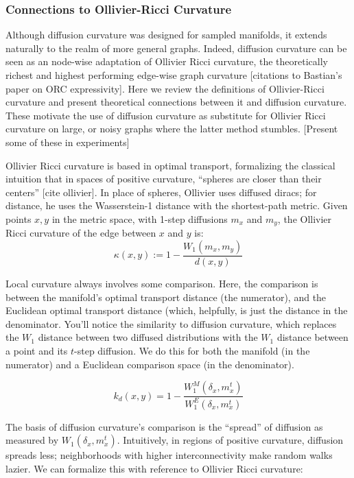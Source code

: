 \documentclass[
  letterpaper,
  DIV=11,
  numbers=noendperiod]{scrartcl}
\begin{document}
\subsubsection{Connections to Ollivier-Ricci
Curvature}\label{connections-to-ollivier-ricci-curvature}

Although diffusion curvature was designed for sampled manifolds, it
extends naturally to the realm of more general graphs. Indeed, diffusion
curvature can be seen as an node-wise adaptation of Ollivier Ricci
curvature, the theoretically richest and highest performing edge-wise
graph curvature {[}citations to Bastian's paper on ORC expressivity{]}.
Here we review the definitions of Ollivier-Ricci curvature and present
theoretical connections between it and diffusion curvature. These
motivate the use of diffusion curvature as substitute for Ollivier Ricci
curvature on large, or noisy graphs where the latter method stumbles.
{[}Present some of these in experiments{]}

Ollivier Ricci curvature is based in optimal transport, formalizing the
classical intuition that in spaces of positive curvature, ``spheres are
closer than their centers'' {[}cite ollivier{]}. In place of spheres,
Ollivier uses diffused diracs; for distance, he uses the Wasserstein-1
distance with the shortest-path metric. Given points \(x,y\) in the
metric space, with 1-step diffusions \(m_{x}\) and \(m_{y}\), the
Ollivier Ricci curvature of the edge between \(x\) and \(y\) is:
\[\kappa(x, y):=1-\frac{W_1\left(m_x, m_y\right)}{d(x, y)}\]

Local curvature always involves some comparison. Here, the comparison is
between the manifold's optimal transport distance (the numerator), and
the Euclidean optimal transport distance (which, helpfully, is just the
distance in the denominator. You'll notice the similarity to diffusion
curvature, which replaces the \(W_{1}\) distance between two diffused
distributions with the \(W_{1}\) distance between a point and its
\(t\)-step diffusion. We do this for both the manifold (in the
numerator) and a Euclidean comparison space (in the denominator).

\[
k_{d}(x,y) = 1 - \frac{W_{1}^M(\delta_{x}, m_{x}^t)}{W_{1}^E(\delta_{x},m_{x}^t)}
\]

The basis of diffusion curvature's comparison is the ``spread'' of
diffusion as measured by \(W_{1}(\delta_{x},m_{x}^t)\). Intuitively, in
regions of positive curvature, diffusion spreads less; neighborhoods
with higher interconnectivity make random walks lazier. We can formalize
this with reference to Ollivier Ricci curvature:
\end{document}
